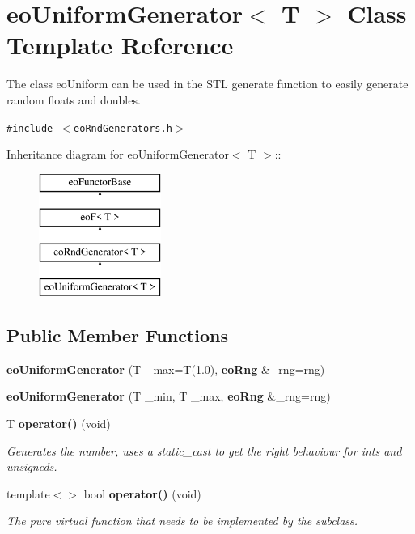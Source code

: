 \section{eo\-Uniform\-Generator$<$ T $>$ Class Template Reference}
\label{classeo_uniform_generator}
The class eo\-Uniform can be used in the STL generate function to easily generate random floats and doubles.  


{\tt \#include $<$eo\-Rnd\-Generators.h$>$}

Inheritance diagram for eo\-Uniform\-Generator$<$ T $>$::\begin{figure}[H]
\begin{center}
\leavevmode
\includegraphics[height=4cm]{classeo_uniform_generator}
\end{center}
\end{figure}
\subsection*{Public Member Functions}
\begin{CompactItemize}
\item 
{\bf eo\-Uniform\-Generator} (T \_\-max=T(1.0), {\bf eo\-Rng} \&\_\-rng=rng)\label{classeo_uniform_generator_a0}

\item 
{\bf eo\-Uniform\-Generator} (T \_\-min, T \_\-max, {\bf eo\-Rng} \&\_\-rng=rng)\label{classeo_uniform_generator_a1}

\item 
T {\bf operator()} (void)\label{classeo_uniform_generator_a2}

\begin{CompactList}\small\item\em Generates the number, uses a static\_\-cast to get the right behaviour for ints and unsigneds. \item\end{CompactList}\item 
template$<$$>$ bool {\bf operator()} (void)\label{classeo_uniform_generator_a3}

\begin{CompactList}\small\item\em The pure virtual function that needs to be implemented by the subclass. \item\end{CompactList}\end{CompactItemize}

